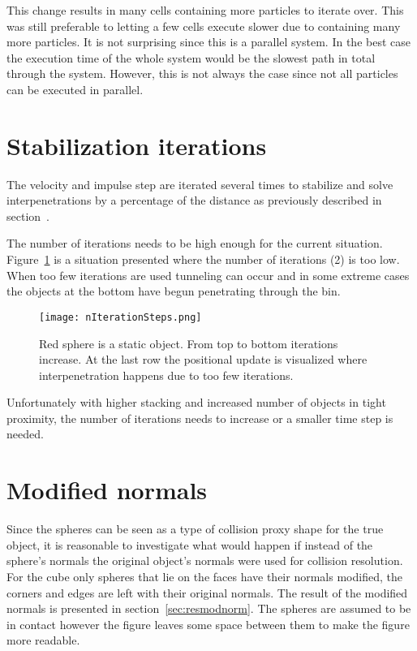 This change results in many cells containing more particles to iterate over. This was still preferable to
 letting a few cells execute slower due to containing many more particles.
It is not surprising since this is a
parallel system. In the best case the execution time of the whole system would be
the slowest path in total through the system. However, this is not always the case
since not all particles can be executed in parallel.

\section{Stabilization iterations} \label{sec:stabil}
The velocity and impulse step are iterated several times to stabilize and solve
interpenetrations by a percentage of the distance as previously described in section~\label{sec:v_bias}.

The number of iterations needs to be high enough for the current situation.
Figure~\ref{fig:iters} is a situation presented where the number of iterations (2) is too low.
 When too few iterations are used tunneling can occur
and in some extreme cases the objects at the bottom have begun penetrating through the bin.

\begin{figure}[H]
  \centering
  \texttt{[image: nIterationSteps.png]}
  \caption{Red sphere is a static object. From top to bottom iterations increase. At the last row the positional update is visualized where interpenetration happens due to too few iterations.}
  \label{fig:iters}
\end{figure}

Unfortunately with higher stacking and increased number of objects in tight proximity,
the number of iterations needs to increase or a smaller time step is needed.

\section{Modified normals}\label{sec:modnorm}
Since the spheres can be seen as a type of collision proxy shape for the true object,
it is reasonable to investigate what would happen if instead of the sphere's normals
the original object's normals were used for collision resolution. For the cube only
spheres that lie on the faces have their normals modified, the corners
and edges are left with their original normals. The result of the modified normals
is presented in section~\ref{sec:resmodnorm}. The spheres are assumed to be in contact however
the figure leaves some space between them to make the figure more readable.


